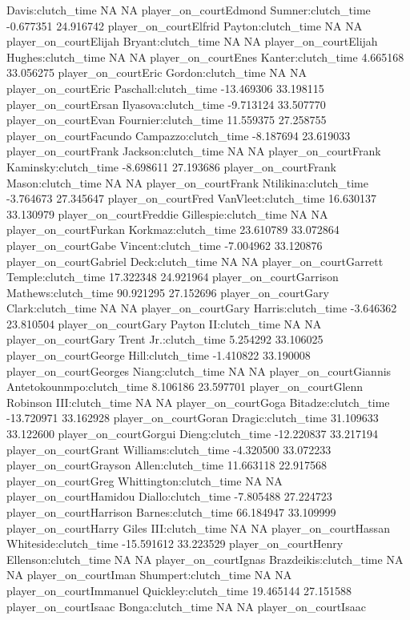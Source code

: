 \documentclass[
  landscape]{article}
\begin{document}
Davis:clutch\_time NA NA player\_on\_courtEdmond Sumner:clutch\_time
-0.677351 24.916742 player\_on\_courtElfrid Payton:clutch\_time NA NA
player\_on\_courtElijah Bryant:clutch\_time NA NA
player\_on\_courtElijah Hughes:clutch\_time NA NA player\_on\_courtEnes
Kanter:clutch\_time 4.665168 33.056275 player\_on\_courtEric
Gordon:clutch\_time NA NA player\_on\_courtEric Paschall:clutch\_time
-13.469306 33.198115 player\_on\_courtErsan Ilyasova:clutch\_time
-9.713124 33.507770 player\_on\_courtEvan Fournier:clutch\_time
11.559375 27.258755 player\_on\_courtFacundo Campazzo:clutch\_time
-8.187694 23.619033 player\_on\_courtFrank Jackson:clutch\_time NA NA
player\_on\_courtFrank Kaminsky:clutch\_time -8.698611 27.193686
player\_on\_courtFrank Mason:clutch\_time NA NA player\_on\_courtFrank
Ntilikina:clutch\_time -3.764673 27.345647 player\_on\_courtFred
VanVleet:clutch\_time 16.630137 33.130979 player\_on\_courtFreddie
Gillespie:clutch\_time NA NA player\_on\_courtFurkan
Korkmaz:clutch\_time 23.610789 33.072864 player\_on\_courtGabe
Vincent:clutch\_time -7.004962 33.120876 player\_on\_courtGabriel
Deck:clutch\_time NA NA player\_on\_courtGarrett Temple:clutch\_time
17.322348 24.921964 player\_on\_courtGarrison Mathews:clutch\_time
90.921295 27.152696 player\_on\_courtGary Clark:clutch\_time NA NA
player\_on\_courtGary Harris:clutch\_time -3.646362 23.810504
player\_on\_courtGary Payton II:clutch\_time NA NA player\_on\_courtGary
Trent Jr.:clutch\_time 5.254292 33.106025 player\_on\_courtGeorge
Hill:clutch\_time -1.410822 33.190008 player\_on\_courtGeorges
Niang:clutch\_time NA NA player\_on\_courtGiannis
Antetokounmpo:clutch\_time 8.106186 23.597701 player\_on\_courtGlenn
Robinson III:clutch\_time NA NA player\_on\_courtGoga
Bitadze:clutch\_time -13.720971 33.162928 player\_on\_courtGoran
Dragic:clutch\_time 31.109633 33.122600 player\_on\_courtGorgui
Dieng:clutch\_time -12.220837 33.217194 player\_on\_courtGrant
Williams:clutch\_time -4.320500 33.072233 player\_on\_courtGrayson
Allen:clutch\_time 11.663118 22.917568 player\_on\_courtGreg
Whittington:clutch\_time NA NA player\_on\_courtHamidou
Diallo:clutch\_time -7.805488 27.224723 player\_on\_courtHarrison
Barnes:clutch\_time 66.184947 33.109999 player\_on\_courtHarry Giles
III:clutch\_time NA NA player\_on\_courtHassan Whiteside:clutch\_time
-15.591612 33.223529 player\_on\_courtHenry Ellenson:clutch\_time NA NA
player\_on\_courtIgnas Brazdeikis:clutch\_time NA NA
player\_on\_courtIman Shumpert:clutch\_time NA NA
player\_on\_courtImmanuel Quickley:clutch\_time 19.465144 27.151588
player\_on\_courtIsaac Bonga:clutch\_time NA NA player\_on\_courtIsaac
\end{document}
